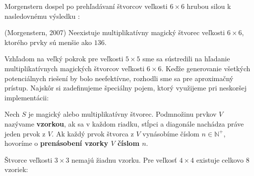 Morgenstern dospel po prehľadávaní štvorcov veľkosti $6 \times 6$ hrubou silou k nasledovnému výsledku \cite{multimagie}:

\begin{theorem} (Morgenstern, 2007) Neexistuje multiplikatívny magický štvorec veľkosti $6 \times 6$, ktorého prvky sú menšie ako $136$.
\end{theorem}

Vzhľadom na veľký pokrok pre veľkosti $5 \times 5$ sme sa sústredili na hľadanie multiplikatívnych magických štvorcov veľkosti $6 \times 6$. Keďže generovanie všetkých potenciálnych riešení by bolo neefektívne, rozhodli sme sa pre aproximačný prístup. Najskôr si zadefinujeme špeciálny pojem, ktorý využijeme pri neskoršej implementácii:

\begin{definition} Nech $S$ je magický alebo multiplikatívny štvorec. Podmnožinu prvkov $V$ nazývame \textbf{vzorkou}, ak sa v každom riadku, stĺpci a diagonále nachádza práve jeden prvok z $V$. Ak každý prvok štvorca z $V$ vynásobíme číslom $n \in \mathbb{N^+}$, hovoríme o \textbf{prenásobení vzorky $V$ číslom $n$}.
\end{definition}

Štvorce veľkosti $3 \times 3$ nemajú žiadnu vzorku. Pre veľkosť $4 \times 4$ existuje celkovo $8$ vzoriek: 

